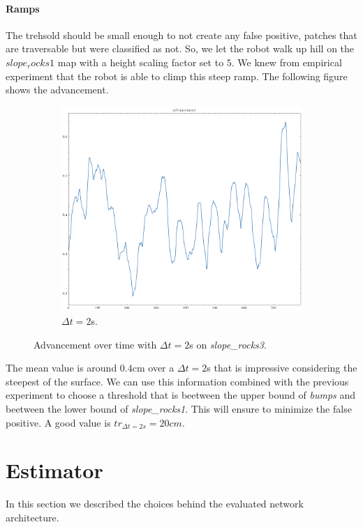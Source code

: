 \documentclass[../document.tex]{subfiles}
\begin{document}
\paragraph{Ramps}
The trehsold should be small enough to not create any false positive, patches that are traversable but were classified as not. So, we let the robot walk up hill on the $slope_rocks1$ map with a height scaling factor set to $5$. We knew from empirical experiment that the robot is able to climp this steep ramp. The following figure shows the advancement.
\begin{figure}[H]
    \centering
    \begin{subfigure}[b]{0.45\textwidth}
        \includegraphics[width=\linewidth]{../img/3/find_tr/100-slope_rocks1}
        \caption{$\Delta t = 2$s.}
    \end{subfigure}
    
    \caption{Advancement over time with $\Delta t = 2$s on \emph{slope\_rocks3}.}
\end{figure}
The mean value is around $0.4$cm over a $\Delta t =2$s that is impressive considering the steepest of the surface. We can use this information combined with the previous experiment to choose a threshold that is beetween the upper bound of \emph{bumps} and beetween the lower bound of \emph{slope\_rocks1}. This will ensure to minimize the false positive. A good value is $tr_{\Delta t = 2s} = 20cm$. 

\section{Estimator}
\label{sec: estimator}
In this section we described the choices behind the evaluated network architecture.
\end{document}
